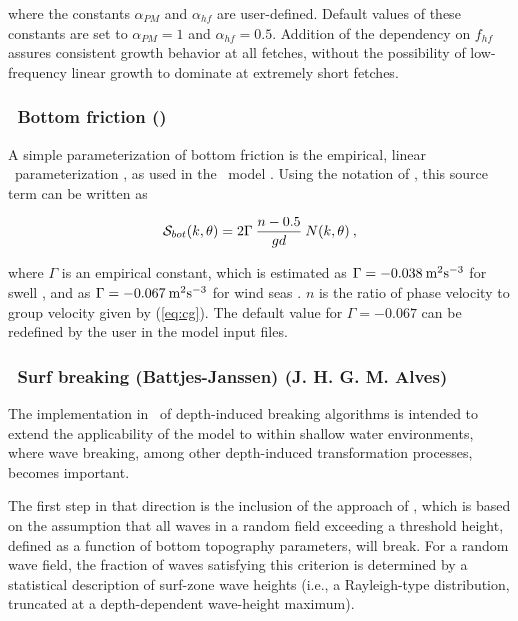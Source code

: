 \noindent
where the constants $\alpha_{PM}$ and $\alpha_{hf}$ are user-defined. Default
values of these constants are set to $\alpha_{PM} = 1$ and $\alpha_{hf} =
0.5$.  Addition of the dependency on $f_{hf}$ assures consistent growth
behavior at all fetches, without the possibility of low-frequency linear
growth to dominate at extremely short fetches.


\vsssub
\subsubsection{~Bottom friction (\js)} \label{sec:jonswap}
\vsssub

A simple parameterization of bottom friction is the empirical, linear \js\
parameterization \citep{art:JONSWAP}, as used in the \wam\ model
\citep{art:WAM88}. Using the notation of \cite{tol:JPO91b}, this source term
can be written as


\begin{equation}
{\cal S}_{bot}(k,\theta) = 2 \Gamma \: \frac{n-0.5}{gd} \: N(k,\theta)
\: , \label{eq:JONSWAP_bot}
\end{equation}

\noindent
where $\Gamma$ is an empirical constant, which is estimated as $\Gamma =
-0.038\:\mbox m^2 \mbox s ^{-3}$ for swell \citep{art:JONSWAP}, and as $\Gamma
= -0.067\:\mbox m^2 \mbox s^{-3}$ for wind seas \citep{art:BK83}. $n$ is the
ratio of phase velocity to group velocity given by (\ref{eq:cg}). The default
value for $\Gamma = -0.067$ can be redefined by the user in the model input
files.


\vsssub
\subsubsection{~Surf breaking (Battjes-Janssen) \hfill {\rm (J. H. G. M. Alves)}} \label{sec:BJ}
\vsssub

The implementation in \ws\ of depth-induced breaking algorithms is intended to
extend the applicability of the model to within shallow water environments,
where wave breaking, among other depth-induced transformation processes,
becomes important.

The first step in that direction is the inclusion of the approach of
\citet[][henceforth denoted as BJ78]{pro:BJ78}, which is based on the
assumption that all waves in a random field exceeding a threshold height,
defined as a function of bottom topography parameters, will break. For a
random wave field, the fraction of waves satisfying this criterion is
determined by a statistical description of surf-zone wave heights (i.e., a
Rayleigh-type distribution, truncated at a depth-dependent wave-height
maximum).

